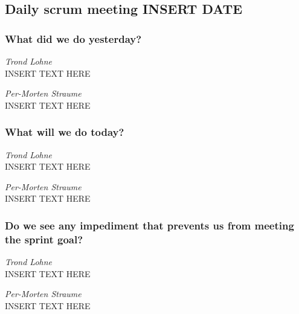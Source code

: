 \documentclass{article}
\begin{document}
\begin{center}
\subsection*{Daily scrum meeting INSERT DATE}
\end{center}
\bigskip


\subsubsection*{What did we do yesterday?}

\noindent\textit{Trond Lohne}\\
INSERT TEXT HERE

\medskip

\noindent\textit{Per-Morten Straume}\\
INSERT TEXT HERE


\subsubsection*{What will we do today?}

\noindent\textit{Trond Lohne}\\
INSERT TEXT HERE

\medskip

\noindent\textit{Per-Morten Straume}\\
INSERT TEXT HERE


\subsubsection*{Do we see any impediment that prevents us from meeting the sprint goal?}

\noindent\textit{Trond Lohne}\\
INSERT TEXT HERE

\medskip

\noindent\textit{Per-Morten Straume}\\
INSERT TEXT HERE
\end{document}
